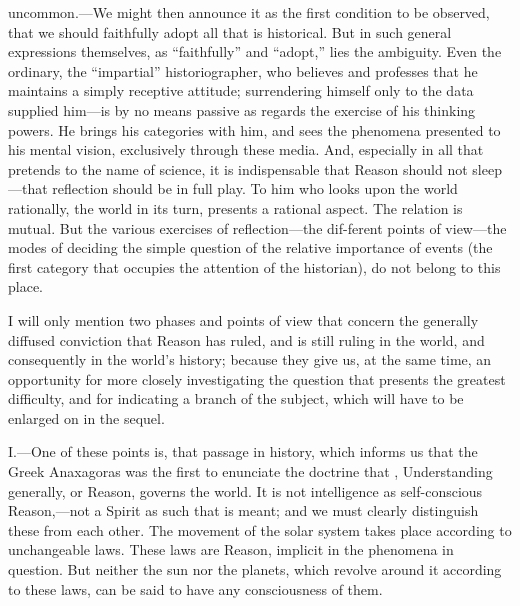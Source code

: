 uncommon.---We might then announce it as the first condition to be
observed, that we should faithfully adopt all that is historical. But
in such general expressions themselves, as ``faithfully'' and
``adopt,'' lies the ambiguity. Even the ordinary, the ``impartial''
historiographer, who believes and professes that he maintains a simply
receptive attitude; surrendering himself only to the data supplied
him---is by no means passive as regards the exercise of his thinking
powers. He brings his categories with him, and sees the phenomena
presented to his mental vision, exclusively through these media. And,
especially in all that pretends to the name of science, it is
indispensable that Reason should not sleep---that reflection should be
in full play. To him who looks upon the world rationally, the world in
its turn, presents a rational aspect. The relation is mutual. But the
various exercises of reflection---the dif-ferent points of
view---the modes of deciding the simple question of the relative
importance of events (the first category that occupies the attention
of the historian), do not belong to this place.

I will only mention two phases and points of view that concern the
generally diffused conviction that Reason has ruled, and is still
ruling in the world, and consequently in the world's history; because
they give us, at the same time, an opportunity for more closely
investigating the question that presents the greatest difficulty, and
for indicating a branch of the subject, which will have to be enlarged
on in the sequel.


I.---One of these points is, that passage in history, which informs us
that the Greek Anaxagoras was the first to enunciate the doctrine that
, Understanding generally, or Reason, governs the world. It
is not intelligence as self-conscious Reason,---not a Spirit as such
that is meant; and we must clearly distinguish these from each other.
The movement of the solar system takes place according to unchangeable
laws. These laws are Reason, implicit in the phenomena in question.
But neither the sun nor the planets, which revolve around it according
to these laws, can be said to have any consciousness of them.

